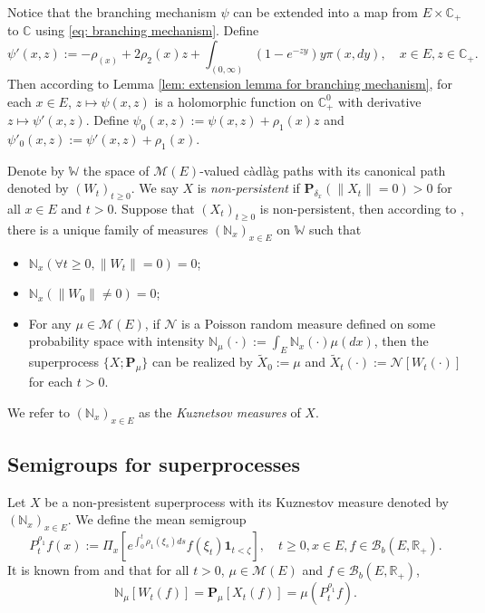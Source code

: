 \documentclass[12pt,a4paper]{amsart}
\theoremstyle{plain}
\theoremstyle{definition}
\numberwithin{equation}{section}
\begin{document}
    Notice that the branching mechanism $\psi$ can be extended into a map from $E \times \mathbb C_+$ to $\mathbb C$ using \eqref{eq: branching mechanism}.
    Define
\begin{equation}
   \psi'(x,z):= - \rho_(x) + 2\rho_2(x) z + \int_{(0,\infty)} (1-e^{-zy})y\pi(x,dy),
    \quad x\in E, z\in \mathbb C_+.
\end{equation}
    Then according to Lemma \ref{lem: extension lemma for branching mechanism}, for each $x \in E$, $z \mapsto \psi(x,z)$ is a holomorphic function on $\mathbb C_+^0$ with derivative $z \mapsto \psi'(x,z)$.
    Define $\psi_0(x,z) := \psi(x,z)+ \rho_1(x)z $ and $\psi'_0(x,z) := \psi'(x,z) + \rho_1(x)$.

    Denote by $\mathbb W$ the space of $\mathcal M(E)$-valued c\`{a}dl\`{a}g paths with its canonical path denoted by $(W_t)_{t\geq 0}$.
    We say $X$ is \emph{non-persistent} if $\mathbf P_{\delta_x}(\|X_t\|= 0) > 0$ for all $x\in E$ and $t> 0$.
    Suppose that $(X_t)_{t\geq 0}$ is non-persistent, then according to \cite[Section 8.4]{Li2011Measure-valued},
    there is a unique family of measures $(\mathbb N_x)_{x\in E}$ on $\mathbb W$ such that
\begin{itemize}
\item
    $\mathbb N_x (\forall t \geq 0, \|W_t\|=0) =0$;
\item
    $\mathbb N_x(\|W_0 \|\neq 0) = 0$;
\item
    For any $\mu \in \mathcal M(E)$, if $\mathcal N$ is a Poisson random measure defined on some probability space
    with intensity $\mathbb N_\mu(\cdot):= \int_E \mathbb N_x(\cdot )\mu(dx)$,
    then the superprocess $\{X;\mathbf P_\mu\}$ can be realized by $\widetilde X_0 := \mu$ and $\widetilde X_t(\cdot) := \mathcal N[W_t(\cdot)]$ for each $t>0$.
\end{itemize}
    We refer to $(\mathbb N_x)_{x\in E}$ as the \emph{Kuznetsov measures} of $X$.
\subsection{{Semigroups for superprocesses}}
\label{sec: definition of vf}
    Let $X$ be a non-presistent superprocess 
    with its Kuznestov measure denoted by $(\mathbb N_x)_{x\in E}$.
    We define the mean semigroup
\begin{equation}
       P_t^{\rho_1} f(x)
    := \Pi_{x}[e^{\int_0^t \rho_1(\xi_s)ds}f(\xi_t) \mathbf 1_{t< \zeta}],
    \quad t\geq 0, x\in E, f\in \mathcal B_b(E,\mathbb R_+).
\end{equation}
    It is known from \cite[Proposition 2.27]{Li2011Measure-valued} and \cite[Theorem 2.7]{Kyprianou2014Fluctuations} that for all $t > 0$, $\mu \in \mathcal M(E)$ and $f\in \mathcal B_b(E,\mathbb R_+)$,
\begin{equation}
\label{eq: mean formula for superprocesses}
    \mathbb N_{\mu}[W_t(f)]
    =\mathbf P_{\mu}[X_t(f)]=
       \mu(P^{\rho_1}_t f).
\end{equation}
\end{document}
